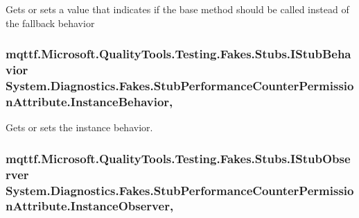 Gets or sets a value that indicates if the base method should be called instead of the fallback behavior

\hypertarget{class_system_1_1_diagnostics_1_1_fakes_1_1_stub_performance_counter_permission_attribute_a4c5883337a59638e4dea735c54542232}{
\subsubsection[{Instance\-Behavior}]{\setlength{\rightskip}{0pt plus 5cm}mqttf.\-Microsoft.\-Quality\-Tools.\-Testing.\-Fakes.\-Stubs.\-I\-Stub\-Behavior System.\-Diagnostics.\-Fakes.\-Stub\-Performance\-Counter\-Permission\-Attribute.\-Instance\-Behavior\hspace{0.3cm}{\ttfamily [get]}, {\ttfamily [set]}}}\label{class_system_1_1_diagnostics_1_1_fakes_1_1_stub_performance_counter_permission_attribute_a4c5883337a59638e4dea735c54542232}


Gets or sets the instance behavior.

\hypertarget{class_system_1_1_diagnostics_1_1_fakes_1_1_stub_performance_counter_permission_attribute_a23278989ac2668edab80bc9206fb881c}{
\subsubsection[{Instance\-Observer}]{\setlength{\rightskip}{0pt plus 5cm}mqttf.\-Microsoft.\-Quality\-Tools.\-Testing.\-Fakes.\-Stubs.\-I\-Stub\-Observer System.\-Diagnostics.\-Fakes.\-Stub\-Performance\-Counter\-Permission\-Attribute.\-Instance\-Observer\hspace{0.3cm}{\ttfamily [get]}, {\ttfamily [set]}}}\label{class_system_1_1_diagnostics_1_1_fakes_1_1_stub_performance_counter_permission_attribute_a23278989ac2668edab80bc9206fb881c}


